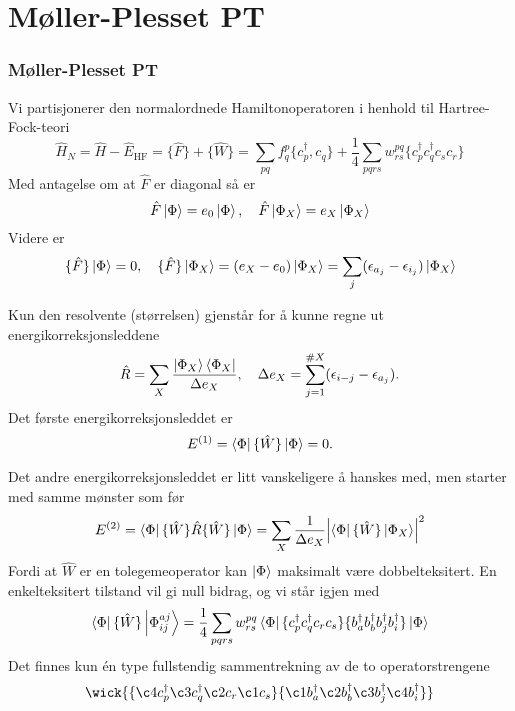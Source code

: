 \documentclass{beamer}
\begin{document}
\section{Møller-Plesset PT}

\begin{frame}
	\frametitle{Møller-Plesset PT}
	Vi partisjonerer den normalordnede Hamiltonoperatoren i henhold til Hartree-Fock-teori
	\begin{equation}
		\hat H_N = \hat H - \hat E_{\text{HF}} = \{\hat F \} + \{ \hat W \} = \sum_{pq}f_q^p \{ c^\dagger_p, c_q\} + \frac{1}{4}\sum_{pqrs}w^{pq}_{rs} \{c^\dagger_p c^\dagger_q c_s c_r \}
	\end{equation}
	Med antagelse om at $\hat F$ er diagonal så er 
	\begin{equation}
		\hat F\ket{\Phi} = e_0 \ket{\Phi}, \quad \hat F \ket{\Phi_X} = e_X \ket{\Phi_X}
	\end{equation}
	Videre er 
	\begin{equation}
		\{\hat F\} \ket{\Phi} = 0, \quad \{\hat F\} \ket{\Phi_X} = (e_X - e_0)\ket{\Phi_X} = \sum_j(\epsilon_{a_j} - \epsilon_{i_j})\ket{\Phi_X}
	\end{equation}
\end{frame}

\begin{frame}
	Kun den resolvente (størrelsen) gjenstår for å kunne regne ut energikorreksjonsleddene
	\begin{equation}
		\hat R = \sum_{X}\frac{\ket{\Phi_X}\bra{\Phi_X}}{\Delta e_X}, \quad \Delta e_X = \sum_{j=1}^{\# X}(\epsilon_{i-j} - \epsilon_{a_j}).
	\end{equation}
	Det første energikorreksjonsleddet er
	\begin{equation}
		E^{(1)} = \bra{\Phi} \{\hat W \} \ket{\Phi} = 0.
	\end{equation}
\end{frame}

\begin{frame}
	Det andre energikorreksjonsleddet er litt vanskeligere å hanskes med, men starter med samme mønster som før
	\begin{equation}
		E^{(2)} = \bra{\Phi}\{\hat W\} \hat R \{\hat W\} \ket{\Phi} = \sum_X \frac{1}{\Delta e_X} \abs{\bra{\Phi}\{\hat W\} \ket{\Phi_X}}^2
	\end{equation}
	Fordi at $\hat W$ er en tolegemeoperator kan $\ket{\Phi}$ maksimalt være dobbelteksitert. En enkelteksitert tilstand vil gi null bidrag, og vi står igjen med
	\begin{align}
		\bra{\Phi} \{\hat W\}\ket{\Phi_{ij}^{aj}} = \frac{1}{4} \sum_{pqrs} w_{rs}^{pq} \bra{\Phi} \{c^\dagger_p c^\dagger_q c_r c_s \} \{b^\dagger_a b^\dagger_b b^\dagger_j b^\dagger_i  \}\ket{\Phi}
	\end{align}
	Det finnes kun én type fullstendig sammentrekning av de to operatorstrengene
	\begin{equation}
		\wick{
		\{\c4 c^\dagger_p \c3 c^\dagger_q \c2 c_r \c1 c_s \} \{ \c1 b^\dagger_a \c2 b^\dagger_b \c3 b^\dagger_j  \c4 b^\dagger_i  \}
		}	
	\end{equation}
\end{frame}
\end{document}
